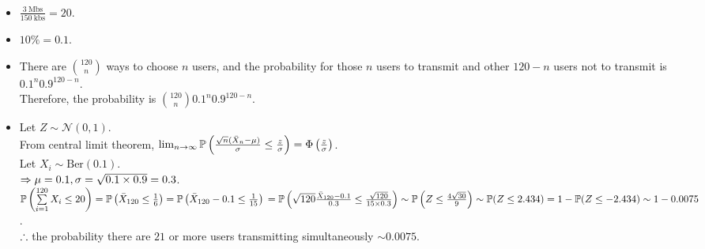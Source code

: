\begin{pr}$ $
\begin{itemize}
\item $\frac{3\ \mathrm{Mbs}}{150\ \mathrm{kbs}}=20$.
\item $10\%=0.1$.
\item There are $\binom{120}n$ ways to choose $n$ users, and the probability for those $n$ users to transmit and other $120-n$ users not to transmit is $0.1^n0.9^{120-n}$.\\
Therefore, the probability is $\binom{120}n0.1^n0.9^{120-n}$.
\item %
Let $Z\sim\mathcal{N}(0, 1)$.\\
From central limit theorem, $\lim_{n\to\infty}\P\left(\frac{\sqrt n(\bar X_n-\mu)}\sigma\leq\frac z\sigma\right)=\Phi\left(\frac z\sigma\right)$.\\
Let $X_i\sim\mathrm{Ber}(0.1)$.\\
$\then\mu=0.1, \sigma=\sqrt{0.1\times0.9}=0.3$.\\
$\P\left(\suml_{i=1}^{120}X_i\leq20\right)=\P\left(\bar X_{120}\leq\frac16\right)=\P\left(\bar X_{120}-0.1\leq\frac1{15}\right)\\
=\P\left(\sqrt{120}\frac{\bar X_{120}-0.1}{0.3}\leq\frac{\sqrt{120}}{15\times0.3}\right)\sim\P\left(Z\leq\frac{4\sqrt{30}}9\right)\sim\P(Z\leq 2.434)=1-\P(Z\leq-2.434)\sim1-0.0075$.\\
$\so$ the probability there are $21$ or more users transmitting simultaneously $\sim0.0075$.
\end{itemize}
\end{pr}

